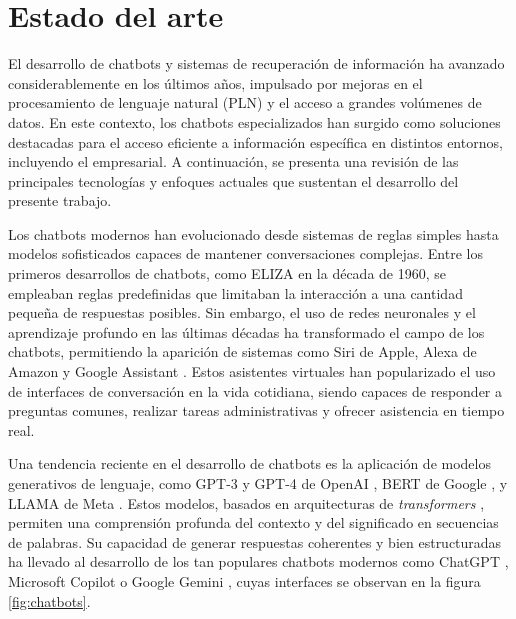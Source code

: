 \section{Estado del arte}

El desarrollo de chatbots y sistemas de recuperación de información ha avanzado considerablemente en los últimos años, 
impulsado por mejoras en el procesamiento de lenguaje natural (PLN) y el acceso a grandes volúmenes de datos. 
En este contexto, los chatbots especializados han surgido como soluciones destacadas para el acceso eficiente 
a información específica en distintos entornos, incluyendo el empresarial. A continuación, se presenta una revisión 
de las principales tecnologías y enfoques actuales que sustentan el desarrollo del presente trabajo.

Los chatbots modernos han evolucionado desde sistemas de reglas simples hasta modelos sofisticados capaces de 
mantener conversaciones complejas. Entre los primeros desarrollos de chatbots, como ELIZA \citep{paper:eliza} en 
la década de 1960, se empleaban reglas predefinidas que limitaban la interacción a una cantidad pequeña de 
respuestas posibles. Sin embargo, el uso de redes neuronales y el aprendizaje profundo en las últimas décadas 
ha transformado el campo de los chatbots, permitiendo la aparición de sistemas como Siri de Apple, Alexa de Amazon 
y Google Assistant \citep{article:voice-assistants}. Estos asistentes virtuales han popularizado el uso de interfaces 
de conversación en la vida cotidiana, siendo capaces de responder a preguntas comunes, realizar tareas administrativas 
y ofrecer asistencia en tiempo real.

Una tendencia reciente en el desarrollo de chatbots es la aplicación de modelos generativos de lenguaje, como GPT-3 y GPT-4 
de OpenAI \citep{paper:gpt}, BERT de Google \citep{paper:bert}, y LLAMA de Meta \citep{paper:llama}. Estos modelos, basados 
en arquitecturas de \textit{transformers} \citep{paper:transformers}, permiten una comprensión profunda del contexto y del 
significado en secuencias de palabras. Su capacidad de generar respuestas coherentes y bien estructuradas ha llevado al 
desarrollo de los tan populares chatbots modernos como ChatGPT \citep{website:chatgpt}, Microsoft Copilot \citep{website:copilot}
o Google Gemini \citep{website:gemini}, cuyas interfaces se observan en la figura \ref{fig:chatbots}.

